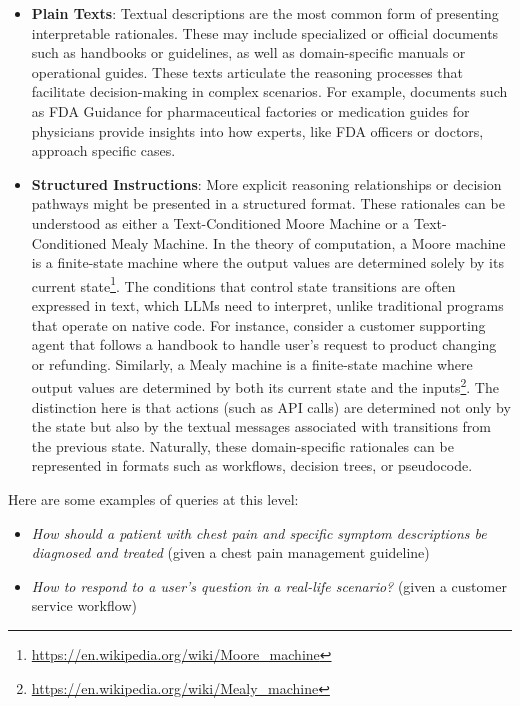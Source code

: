 \begin{itemize}
    \item \textbf{Plain Texts}: Textual descriptions are the most common form of presenting interpretable rationales. These may include specialized or official documents such as handbooks or guidelines, as well as domain-specific manuals or operational guides. These texts articulate the reasoning processes that facilitate decision-making in complex scenarios. For example, documents such as FDA Guidance for pharmaceutical factories or medication guides for physicians provide insights into how experts, like FDA officers or doctors, approach specific cases.
    \item \textbf{Structured Instructions}: More explicit reasoning relationships or decision pathways might be presented in a structured format. These rationales can be understood as either a Text-Conditioned Moore Machine or a Text-Conditioned Mealy Machine. In the theory of computation, a Moore machine is a finite-state machine where the output values are determined solely by its current state\footnote{\url{https://en.wikipedia.org/wiki/Moore_machine}}. The conditions that control state transitions are often expressed in text, which LLMs need to interpret, unlike traditional programs that operate on native code. For instance, consider a customer supporting agent that follows a handbook to handle user's request to product changing or refunding. Similarly, a Mealy machine is a finite-state machine where output values are determined by both its current state and the inputs\footnote{\url{https://en.wikipedia.org/wiki/Mealy_machine}}. The distinction here is that actions (such as API calls) are determined not only by the state but also by the textual messages associated with transitions from the previous state. 
    Naturally, these domain-specific rationales can be represented in formats such as workflows, decision trees, or pseudocode.
\end{itemize}

Here are some examples of queries at this level:
\begin{itemize}
    \item \textit{How should a patient with chest pain and specific symptom descriptions be diagnosed and treated} (given a chest pain management guideline)
    \item \textit{How to respond to a user's question in a real-life scenario?} (given a customer service workflow)
\end{itemize}

